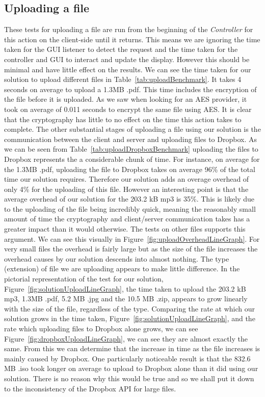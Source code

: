 \documentclass[12pt, titlepage]{article}
\begin{document}
\subsection{Uploading a file}
These tests for uploading a file are run from the beginning of the \textit{Controller} for this action on the client-side until it returns. This means we are ignoring the time taken for the GUI listener to detect the request and the time taken for the controller and GUI to interact and update the display. However this should be minimal and have little effect on the results.
\newline \indent We can see the time taken for our solution to upload different files in Table~\ref{tab:uploadBenchmark}. It takes 4 seconds on average to upload a 1.3MB .pdf. This time includes the encryption of the file before it is uploaded. As we saw when looking for an AES provider, it took on average of 0.011 seconds to encrypt the same file using AES. It is clear that the cryptography has little to no effect on the time this action takes to complete. The other substantial stages of uploading a file using our solution is the communication between the client and server and uploading files to Dropbox.
\newline \indent As we can be seen from Table~\ref{tab:uploadDropboxBenchmark} uploading the files to Dropbox represents the a considerable chunk of time. For instance, on average for the 1.3MB .pdf, uploading the file to Dropbox takes on average 96\% of the total time our solution requires. Therefore our solution adds an overage overhead of only 4\% for the uploading of this file. However an interesting point is that the average overhead of our solution for the 203.2 kB mp3 is 35\%. This is likely due to the uploading of the file being incredibly quick, meaning the reasonably small amount of time the cryptography and client/server communication takes has a greater impact than it would otherwise. The tests on other files supports this argument. We can see this visually in Figure~\ref{fig:uploadOverheadLineGraph}. For very small files the overhead is fairly large but as the size of the file increases the overhead causes by our solution descends into almost nothing.
\newline \indent The type (extension) of file we are uploading appears to make little difference. In the pictorial representation of the test for our solution, Figure~\ref{fig:solutionUploadLineGraph}, the time taken to upload the 203.2 kB mp3, 1.3MB .pdf, 5.2 MB .jpg and the 10.5 MB .zip, appears to grow linearly with the size of the file, regardless of the type. Comparing the rate at which our solution grows in the time taken, Figure~\ref{fig:solutionUploadLineGraph}, and the rate which uploading files to Dropbox alone grows, we can see Figure~\ref{fig:dropboxUploadLineGraph}, we can see they are almost exactly the same. From this we can determine that the increase in time as the file increases is mainly caused by Dropbox.
\newline \indent One particularly noticeable result is that the 832.6 MB .iso took longer on average to upload to Dropbox alone than it did using our solution. There is no reason why this would be true and so we shall put it down to the inconsistency of the Dropbox API for large files.
\end{document}
